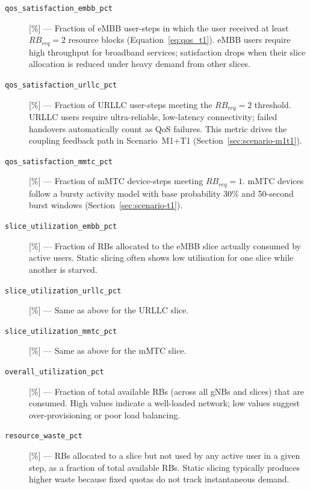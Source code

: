 \begin{description}

\item[\texttt{qos\_satisfaction\_embb\_pct}] [\%] ---
  Fraction of eMBB user-steps in which the user received at least
  $RB_{req} = 2$ resource blocks (Equation~\ref{eq:qos_t1}).  eMBB users
  require high throughput for broadband services; satisfaction drops when their
  slice allocation is reduced under heavy demand from other slices.

\item[\texttt{qos\_satisfaction\_urllc\_pct}] [\%] ---
  Fraction of URLLC user-steps meeting the $RB_{req} = 2$ threshold.  URLLC
  users require ultra-reliable, low-latency connectivity; failed handovers
  automatically count as QoS failures.  This metric drives the coupling
  feedback path in Scenario~M1+T1 (Section~\ref{sec:scenario-m1t1}).

\item[\texttt{qos\_satisfaction\_mmtc\_pct}] [\%] ---
  Fraction of mMTC device-steps meeting $RB_{req} = 1$.  mMTC devices follow a
  bursty activity model with base probability 30\% and 50-second burst windows
  (Section~\ref{sec:scenario-t1}).

\item[\texttt{slice\_utilization\_embb\_pct}] [\%] ---
  Fraction of RBs allocated to the eMBB slice actually consumed by active
  users.  Static slicing often shows low utilisation for one slice while
  another is starved.

\item[\texttt{slice\_utilization\_urllc\_pct}] [\%] ---
  Same as above for the URLLC slice.

\item[\texttt{slice\_utilization\_mmtc\_pct}] [\%] ---
  Same as above for the mMTC slice.

\item[\texttt{overall\_utilization\_pct}] [\%] ---
  Fraction of total available RBs (across all gNBs and slices) that are
  consumed.  High values indicate a well-loaded network; low values suggest
  over-provisioning or poor load balancing.

\item[\texttt{resource\_waste\_pct}] [\%] ---
  RBs allocated to a slice but not used by any active user in a given step,
  as a fraction of total available RBs.  Static slicing typically produces
  higher waste because fixed quotas do not track instantaneous demand.

\end{description}

